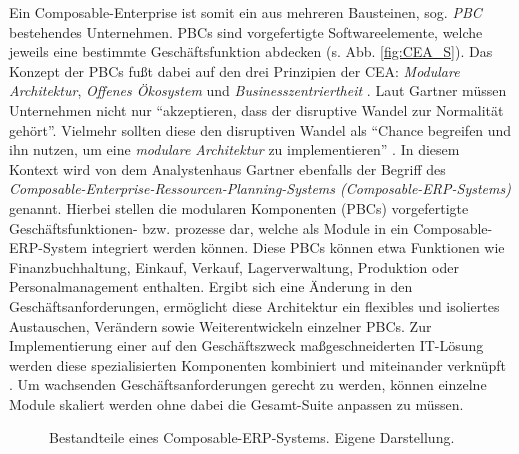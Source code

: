 Ein Composable-Enterprise ist somit ein aus mehreren Bausteinen, sog. \textit{\ac{PBC}} bestehendes Unternehmen. PBCs sind vorgefertigte Softwareelemente, welche jeweils eine bestimmte Geschäftsfunktion abdecken (s. Abb. \ref{fig:CEA_S}). Das Konzept der PBCs fußt dabei auf den drei Prinzipien der CEA: \textit{Modulare Architektur}, \textit{Offenes Ökosystem} und \textit{Businesszentriertheit} \cite{.20230313}. Laut Gartner müssen Unternehmen nicht nur \enquote{akzeptieren, dass der disruptive Wandel zur Normalität gehört}. Vielmehr sollten diese den disruptiven Wandel als \enquote{Chance begreifen und ihn nutzen, um eine \textit{modulare Architektur} zu implementieren} \cite{.20230313}. In diesem Kontext wird von dem Analystenhaus Gartner ebenfalls der Begriff des \textit{Composable-Enterprise-Ressourcen-Planning-Systems (Composable-\acs{ERP}-Systems)} genannt. Hierbei stellen die modularen Komponenten (PBCs) vorgefertigte Geschäftsfunktionen- bzw. prozesse dar, welche als Module in ein Composable-ERP-System integriert werden können. Diese PBCs können etwa Funktionen wie Finanzbuchhaltung, Einkauf, Verkauf, Lagerverwaltung, Produktion oder Personalmanagement enthalten. Ergibt sich eine Änderung in den Geschäftsanforderungen, ermöglicht diese Architektur ein flexibles und isoliertes Austauschen, Verändern sowie Weiterentwickeln einzelner PBCs. Zur Implementierung einer auf den Geschäftszweck maßgeschneiderten IT-Lösung werden diese spezialisierten Komponenten kombiniert und miteinander verknüpft \cite[315]{Chang.1019202010232020}. Um wachsenden Geschäftsanforderungen gerecht zu werden, können einzelne Module skaliert werden ohne dabei die Gesamt-Suite anpassen zu müssen. 
\begin{center}
	\begin{figure}[H]
		\centering
		\caption[Bestandteile eines Composable-ERP-Systems]{Bestandteile eines Composable-ERP-Systems. Eigene Darstellung.}
		\label{fig:CERP}
	\end{figure}	
\end{center}
\vspace*{-15mm}
